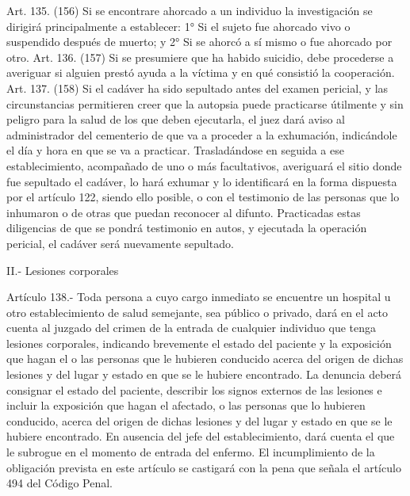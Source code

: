     Art. 135. (156) Si se encontrare ahorcado a un individuo la investigación se dirigirá principalmente a establecer:
    1° Si el sujeto fue ahorcado vivo o suspendido después de muerto; y
    2° Si se ahorcó a sí mismo o fue ahorcado por otro.
    Art. 136. (157) Si se presumiere que ha habido suicidio, debe procederse a averiguar si alguien prestó ayuda a la víctima y en qué consistió la cooperación.
    Art. 137. (158) Si el cadáver ha sido sepultado antes del examen pericial, y las circunstancias permitieren creer que la autopsia puede practicarse útilmente y sin peligro para la salud de los que deben ejecutarla, el juez dará aviso al administrador del cementerio de que va a proceder a la exhumación, indicándole el día y hora en que se va a practicar.
    Trasladándose en seguida a ese establecimiento, acompañado de uno o más facultativos, averiguará el sitio donde fue sepultado el cadáver, lo hará exhumar y lo identificará en la forma dispuesta por el artículo 122, siendo ello posible, o con el testimonio de las personas que lo inhumaron o de otras que puedan reconocer al difunto.
    Practicadas estas diligencias de que se pondrá testimonio en autos, y ejecutada la operación pericial, el cadáver será nuevamente sepultado.

    II.- Lesiones corporales

    Artículo 138.- Toda persona a cuyo cargo inmediato se encuentre un hospital u otro establecimiento de salud semejante, sea público o privado, dará en el acto cuenta al juzgado del crimen de la entrada de cualquier individuo que tenga lesiones corporales, indicando brevemente el estado del paciente y la exposición que hagan el o las personas que le hubieren conducido acerca del origen de dichas lesiones y del lugar y estado en que se le hubiere encontrado. La denuncia deberá consignar el estado del paciente, describir los signos externos de las lesiones e incluir la exposición que hagan el afectado, o las personas que lo hubieren conducido, acerca del origen de dichas lesiones y del lugar y estado en que se le hubiere encontrado.
    En ausencia del jefe del establecimiento, dará cuenta el que le subrogue en el momento de entrada del enfermo.
    El incumplimiento de la obligación prevista en este artículo se castigará con la pena que señala el artículo 494 del Código Penal.

